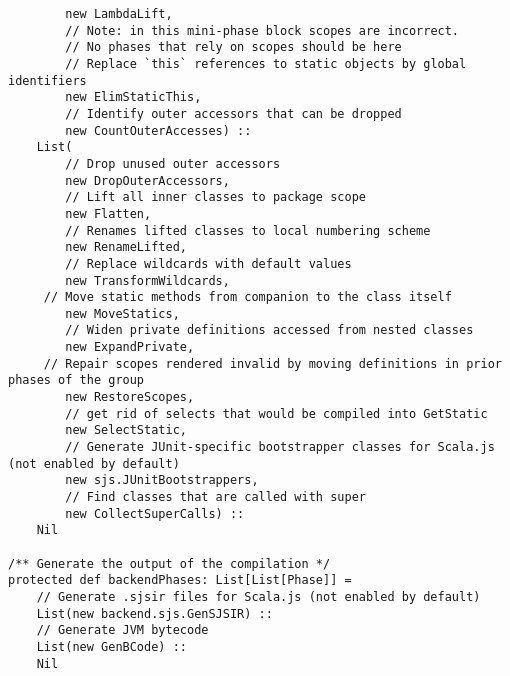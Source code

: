 \documentclass[letterpaper,12pt,titlepage,oneside,final]{book}
\begin{document}
\begin{verbatim}
		new LambdaLift,             
		// Note: in this mini-phase block scopes are incorrect. 
		// No phases that rely on scopes should be here
		// Replace `this` references to static objects by global identifiers
		new ElimStaticThis,         
		// Identify outer accessors that can be dropped
		new CountOuterAccesses) :: 
	List(
		// Drop unused outer accessors
		new DropOuterAccessors,     
		// Lift all inner classes to package scope
		new Flatten,                
		// Renames lifted classes to local numbering scheme
		new RenameLifted,           
		// Replace wildcards with default values
		new TransformWildcards,     
	 // Move static methods from companion to the class itself
		new MoveStatics,           
		// Widen private definitions accessed from nested classes
		new ExpandPrivate,          
	 // Repair scopes rendered invalid by moving definitions in prior phases of the group
		new RestoreScopes,         
		// get rid of selects that would be compiled into GetStatic
		new SelectStatic,           
		// Generate JUnit-specific bootstrapper classes for Scala.js (not enabled by default)
		new sjs.JUnitBootstrappers, 
		// Find classes that are called with super
		new CollectSuperCalls) ::   
	Nil
	
/** Generate the output of the compilation */
protected def backendPhases: List[List[Phase]] =
	// Generate .sjsir files for Scala.js (not enabled by default)
	List(new backend.sjs.GenSJSIR) :: 
	// Generate JVM bytecode
	List(new GenBCode) ::             
	Nil
\end{verbatim}
\end{document}
